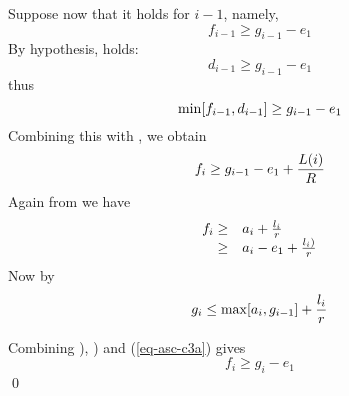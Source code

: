 Suppose now that it holds for $i-1$, namely,
$$f_{i-1} \geq g_{i-1} -e_1$$
By hypothesis,  holds:
$$d_{i-1} \geq g_{i-1} - e_1$$
thus
\begin{equation}\mylabel{eq-asc-c4a}
 \min [f_{i-1}, d_{i-1}]  \geq g_{i-1} - e_1
\end{equation}
Combining this with , we obtain
\begin{equation}\mylabel{eq-asc-c5a}
  f_i \geq g_{i-1} - e_1 + \frac{L(i)}{R}
\end{equation}
Again from  we have
\begin{equation}\mylabel{eq-asc-c6a}
  \begin{array}{rl}
   f_i \geq & a_i+ \frac{l_i}{r}\\
   \geq &a_i - e_1 + \frac{l_i)}{r}
  \end{array}
\end{equation}
Now by 
\begin{equation}\mylabel{eq-asc-c3a}
  g_i \leq \max [ a_i, g_{i-1}] + \frac{l_i}{r}
\end{equation}

 Combining  ),
) and (\ref{eq-asc-c3a}) gives
$$f_i \geq g_i-e_1$$
\qed

